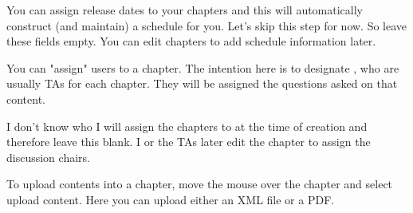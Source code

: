 \begin{gram}  
You can assign release dates to your chapters and this will
automatically construct (and maintain) a schedule for you.  Let's skip
this step for now.  So leave these fields empty.  You can edit
chapters to add schedule information later.
\end{gram}


\begin{gram}
You can "assign" users to a chapter.  The intention here is to
designate , who are usually TAs for each
chapter. 
%
They will be assigned the questions asked on that content.

I don't know who I will assign the chapters to at the time of creation and therefore leave this blank.  I or the TAs later edit the chapter to assign the discussion chairs. 
\end{gram}

\begin{gram}
\label{guide:chapter::upload::window}
To upload contents into a chapter, move the mouse over the chapter and
select upload content.  Here you can upload either an XML
file or a PDF.  
\end{gram}

